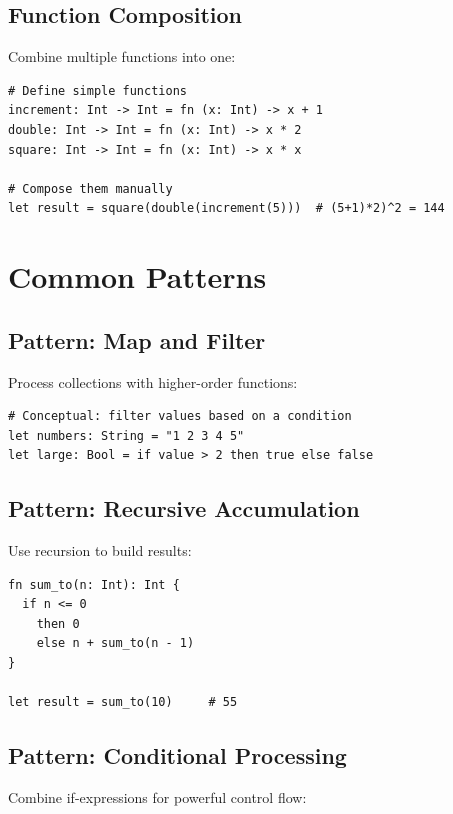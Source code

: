 \documentclass[11pt,twoside,openright]{book}
\begin{document}
\section{Function Composition}

Combine multiple functions into one:

\begin{lstlisting}[language=ConstructLang]
# Define simple functions
increment: Int -> Int = fn (x: Int) -> x + 1
double: Int -> Int = fn (x: Int) -> x * 2
square: Int -> Int = fn (x: Int) -> x * x

# Compose them manually
let result = square(double(increment(5)))  # (5+1)*2)^2 = 144
\end{lstlisting}

\chapter{Common Patterns}

\section{Pattern: Map and Filter}

Process collections with higher-order functions:

\begin{lstlisting}[language=ConstructLang]
# Conceptual: filter values based on a condition
let numbers: String = "1 2 3 4 5"
let large: Bool = if value > 2 then true else false
\end{lstlisting}

\section{Pattern: Recursive Accumulation}

Use recursion to build results:

\begin{lstlisting}[language=ConstructLang]
fn sum_to(n: Int): Int {
  if n <= 0
    then 0
    else n + sum_to(n - 1)
}

let result = sum_to(10)     # 55
\end{lstlisting}

\section{Pattern: Conditional Processing}

Combine if-expressions for powerful control flow:
\end{document}
